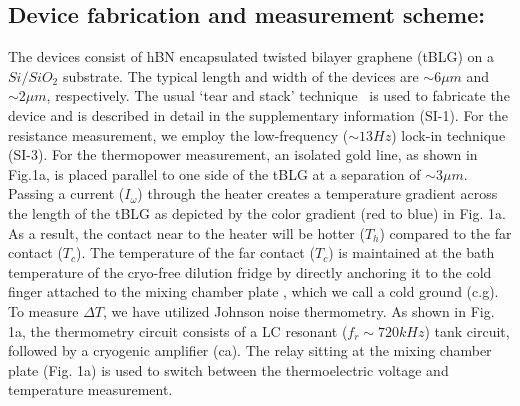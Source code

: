 \documentclass{nature}
\begin{document}
\subsection{Device fabrication and measurement scheme:}
The devices consist of hBN encapsulated twisted bilayer graphene (tBLG) on a $Si/SiO_2$ substrate. The typical length and width of the devices are $\sim 6\mu m$ and $\sim 2\mu m$, respectively. The usual `tear and stack' technique~\cite{cao2018correlated,cao2018unconventional} is used to fabricate the device and is described in detail in the supplementary information (SI-1). For the resistance measurement, we employ the low-frequency ($\sim 13 Hz$) lock-in technique (SI-3). For the thermopower measurement, an isolated gold line, as shown in Fig.1a, is placed parallel to one side of the tBLG at a separation of $\sim 3\mu m$. Passing a current ($I_{\omega}$) through the heater creates a temperature gradient across the length of the tBLG as depicted by the color gradient (red to blue) in Fig. 1a. As a result, the contact near to the heater will be hotter ($T_h$) compared to the far contact ($T_c$). The temperature of the far contact ($T_c$) is maintained at the bath temperature of the cryo-free dilution fridge by directly anchoring it to the cold finger attached to the mixing chamber plate %
, which we call a cold ground (c.g). To measure $\Delta T$, we have utilized Johnson noise thermometry. As shown in Fig. 1a, the thermometry circuit consists of a LC resonant ($f_r\sim 720kHz$) tank circuit, followed by a cryogenic amplifier (ca). The relay sitting at the mixing chamber plate (Fig. 1a) is used to switch between the thermoelectric voltage and temperature measurement. 
\end{document}
